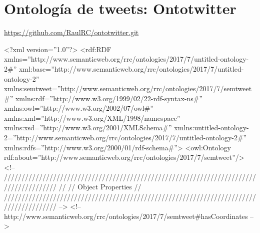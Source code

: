 \chapter{Ontología de tweets: Ontotwitter}
\label{chap:ontotwitter}

\url{https://github.com/RaulRC/ontotwitter.git}

\begin{listing}[
  language = XML,
  numbers=left,
  numberstyle=\tiny,
  stepnumber=5,
  numbersep=5pt,
  frame=single,
  caption  = {Ontología de tweets: Ontotwitter},
  label    = code:ontotwitter]
<?xml version=''1.0''?>
<rdf:RDF
xmlns=''http://www.semanticweb.org/rrc/ontologies/2017/7/untitled-ontology-2#''
     xml:base=''http://www.semanticweb.org/rrc/ontologies/2017/7/untitled-ontology-2''
     xmlns:semtweet=''http://www.semanticweb.org/rrc/ontologies/2017/7/semtweet#''
     xmlns:rdf=''http://www.w3.org/1999/02/22-rdf-syntax-ns#''
     xmlns:owl=''http://www.w3.org/2002/07/owl#''
     xmlns:xml=''http://www.w3.org/XML/1998/namespace''
     xmlns:xsd=''http://www.w3.org/2001/XMLSchema#''
     xmlns:untitled-ontology-2=''http://www.semanticweb.org/rrc/ontologies/2017/7/untitled-ontology-2#''
     xmlns:rdfs=''http://www.w3.org/2000/01/rdf-schema#''>
    <owl:Ontology
    rdf:about=''http://www.semanticweb.org/rrc/ontologies/2017/7/semtweet''/>
    <!-- 
    ///////////////////////////////////////////////////////////////////////////////////////
    //
    // Object Properties
    //
    ///////////////////////////////////////////////////////////////////////////////////////
     -->
    <!--
    http://www.semanticweb.org/rrc/ontologies/2017/7/semtweet#hasCoordinates -->


\end{listing}
